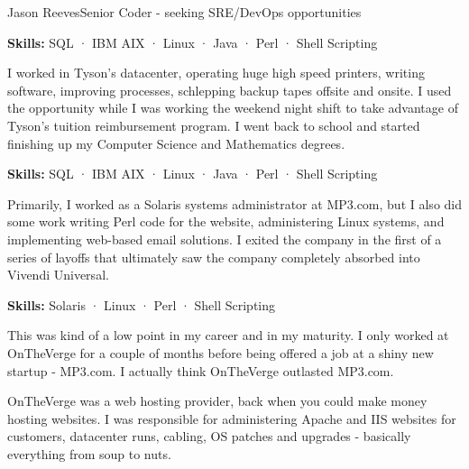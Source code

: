 \documentclass{article}
\begin{document}
\begin{cv}[avatar]{Jason Reeves}{Senior Coder - seeking SRE/DevOps opportunities}
\begin{cvevent}[Sep 2004][Sep 2005]
  \textbf{Skills:} SQL · IBM AIX · Linux · Java · Perl · Shell Scripting
  \vspace*{5mm}
\end{cvevent}

\begin{cvevent}[Sep 2001][Sep 2004]
  I worked in Tyson's datacenter, operating huge high speed printers, writing software, improving processes, schlepping backup tapes offsite and onsite. I used the opportunity while I was working the weekend night shift to take advantage of Tyson's tuition reimbursement program. I went back to school and started finishing up my Computer Science and Mathematics degrees.
  \vspace*{3mm}
  
  \textbf{Skills:} SQL · IBM AIX · Linux · Java · Perl · Shell Scripting
  \vspace*{5mm}
\end{cvevent}

\begin{cvevent}[May 2000][Jan 2001]
  Primarily, I worked as a Solaris systems administrator at MP3.com, but I also did some work writing Perl code for the website, administering Linux systems, and implementing web-based email solutions. I exited the company in the first of a series of layoffs that ultimately saw the company completely absorbed into Vivendi Universal.
  \vspace*{3mm}
  
  \textbf{Skills:} Solaris · Linux · Perl · Shell Scripting
  \vspace*{5mm}
\end{cvevent}

\begin{cvevent}[Mar 2000][May 2000]
  This was kind of a low point in my career and in my maturity. I only worked at OnTheVerge for a couple of months before being offered a job at a shiny new startup - MP3.com. I actually think OnTheVerge outlasted MP3.com. 
  \vspace*{3mm}
  
  OnTheVerge was a web hosting provider, back when you could make money hosting websites. I was responsible for administering Apache and IIS websites for customers, datacenter runs, cabling, OS patches and upgrades - basically everything from soup to nuts.
  \vspace*{3mm}
  

\end{cvevent}
\end{cv}
\end{document}
